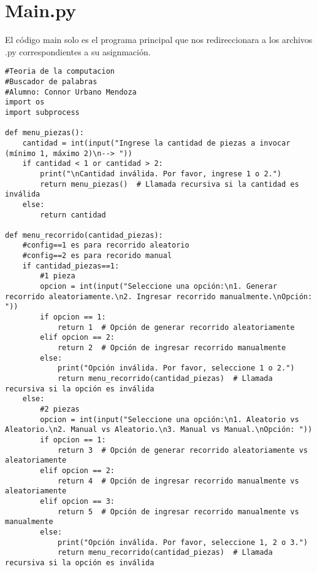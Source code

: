 \section{Main.py}
El código main solo es el programa principal que nos redireccionara a los archivos .py correspondientes a su asignmación. \newline
\\
\begin{lstlisting}
#Teoria de la computacion
#Buscador de palabras
#Alumno: Connor Urbano Mendoza
import os
import subprocess

def menu_piezas():
    cantidad = int(input("Ingrese la cantidad de piezas a invocar (mínimo 1, máximo 2)\n--> "))
    if cantidad < 1 or cantidad > 2:
        print("\nCantidad inválida. Por favor, ingrese 1 o 2.")
        return menu_piezas()  # Llamada recursiva si la cantidad es inválida
    else:
        return cantidad

def menu_recorrido(cantidad_piezas):
    #config==1 es para recorrido aleatorio
    #config==2 es para recorido manual
    if cantidad_piezas==1:
        #1 pieza
        opcion = int(input("Seleccione una opción:\n1. Generar recorrido aleatoriamente.\n2. Ingresar recorrido manualmente.\nOpción: "))
        if opcion == 1:
            return 1  # Opción de generar recorrido aleatoriamente
        elif opcion == 2:
            return 2  # Opción de ingresar recorrido manualmente
        else:
            print("Opción inválida. Por favor, seleccione 1 o 2.")
            return menu_recorrido(cantidad_piezas)  # Llamada recursiva si la opción es inválida
    else:
        #2 piezas
        opcion = int(input("Seleccione una opción:\n1. Aleatorio vs Aleatorio.\n2. Manual vs Aleatorio.\n3. Manual vs Manual.\nOpción: "))
        if opcion == 1:
            return 3  # Opción de generar recorrido aleatoriamente vs aleatoriamente
        elif opcion == 2:
            return 4  # Opción de ingresar recorrido manualmente vs aleatoriamente
        elif opcion == 3:
            return 5  # Opción de ingresar recorrido manualmente vs manualmente
        else:
            print("Opción inválida. Por favor, seleccione 1, 2 o 3.")
            return menu_recorrido(cantidad_piezas)  # Llamada recursiva si la opción es inválida
    

\end{lstlisting}
